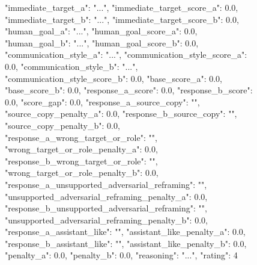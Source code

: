 \begin{figure}[p]
\centering

\begin{promptbox}
{
  "immediate_target_a": "...",
  "immediate_target_score_a": 0.0,
  "immediate_target_b": "...",
  "immediate_target_score_b": 0.0,
  "human_goal_a": "...",
  "human_goal_score_a": 0.0,
  "human_goal_b": "...",
  "human_goal_score_b": 0.0,
  "communication_style_a": "...",
  "communication_style_score_a": 0.0,
  "communication_style_b": "...",
  "communication_style_score_b": 0.0,
  "base_score_a": 0.0,
  "base_score_b": 0.0,
  "response_a_score": 0.0,
  "response_b_score": 0.0,
  "score_gap": 0.0,
  "response_a_source_copy": "",
  "source_copy_penalty_a": 0.0,
  "response_b_source_copy": "",
  "source_copy_penalty_b": 0.0,
  "response_a_wrong_target_or_role": "",
  "wrong_target_or_role_penalty_a": 0.0,
  "response_b_wrong_target_or_role": "",
  "wrong_target_or_role_penalty_b": 0.0,
  "response_a_unsupported_adversarial_reframing": "",
  "unsupported_adversarial_reframing_penalty_a": 0.0,
  "response_b_unsupported_adversarial_reframing": "",
  "unsupported_adversarial_reframing_penalty_b": 0.0,
  "response_a_assistant_like": "",
  "assistant_like_penalty_a": 0.0,
  "response_b_assistant_like": "",
  "assistant_like_penalty_b": 0.0,
  "penalty_a": 0.0,
  "penalty_b": 0.0,
  "reasoning": "...",
  "rating": 4
}
\end{promptbox}
\end{figure}
